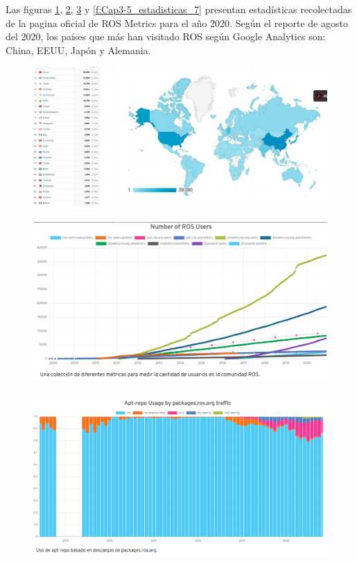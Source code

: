         Las figuras \ref{f:Cap3-5_estadisticas_4}, \ref{f:Cap3-5_estadisticas_5}, \ref{f:Cap3-5_estadisticas_6} y \ref{f:Cap3-5_estadisticas_7}  presentan estadísticas recolectadas de la pagina oficial de ROS Metrics para el año 2020. Según el reporte de agosto del 2020, los países que más han visitado ROS según Google Analytics son: China, EEUU, Japón y Alemania.
        
        \begin{figure}[htb]
            \centering
            \includegraphics[width=0.8\linewidth]{Main/Chapter3/Images3/cap3_estadisticas_7.png}
            \caption{}
            \label{f:Cap3-5_estadisticas_4}
        \end{figure}  
        
        \begin{figure}[htb]
            \centering
            \includegraphics[width=0.8\linewidth]{Main/Chapter3/Images3/cap3_estadisticas_4.png}
            \caption{}
            \label{f:Cap3-5_estadisticas_5}
        \end{figure}  
        
        \newpage


        \begin{figure}[htb]
            \centering
            \includegraphics[width=0.95\linewidth]{Main/Chapter3/Images3/cap3_estadisticas_5.png}
            \caption{}
            \label{f:Cap3-5_estadisticas_6}
        \end{figure}  


